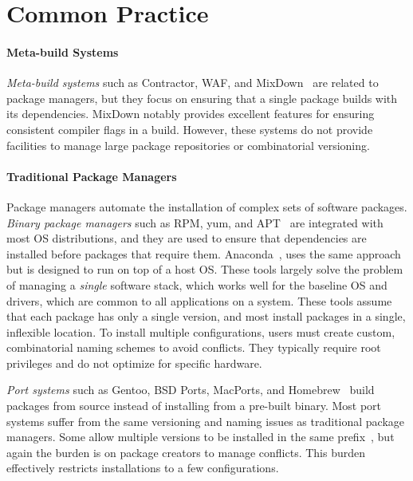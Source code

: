 
\section{Common Practice}
\label{sec:motivation}

\paragraph{Meta-build Systems}
{\it Meta-build systems} such as Contractor, WAF, and
MixDown~\cite{amundson:contractor,epperly+:mixdown,epperly+:mixdown-report,nagy:waf} are
related to package managers, but they focus on ensuring that a single
package builds with its dependencies.  MixDown notably provides excellent
features for ensuring consistent compiler flags in a build.
However, these systems do not provide facilities to manage
large package repositories or combinatorial versioning.

\paragraph{Traditional Package Managers}
Package managers automate the installation of complex sets of software packages.
{\it Binary package managers} such as RPM, yum, and APT~\cite{foster+:rpm03,silva:apt01,yum} are integrated with most
OS distributions, and they are used to ensure that dependencies
are installed before packages that require them.
Anaconda~\cite{anaconda,conda}, uses the same approach but
is designed to run on top of a host OS.
These tools largely solve the problem of managing a {\it single} software
stack, which works well for the baseline OS and drivers, which are
common to all applications on a system.
These tools assume that each package has only a single version,
and most install packages in a single, inflexible location.
To install multiple configurations, users must create custom, combinatorial
naming schemes to avoid conflicts. They typically require root
privileges and do not optimize for specific hardware.

{\it Port systems} such as Gentoo, BSD Ports, MacPorts, and
Homebrew~\cite{bsdports,groffen:gentoo-prefix,homebrew,macports,thiruvathukal:gentoo04}
build packages from source instead of installing from a pre-built binary.
Most port systems suffer from
the same versioning and naming issues as traditional package managers.
Some allow multiple versions to be installed in the same
prefix~\cite{groffen:gentoo-prefix}, but again the burden is on package
creators to manage conflicts. This burden effectively restricts installations
to a few configurations.


